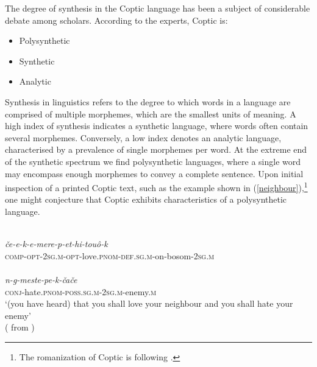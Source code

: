 \documentclass[output=paper,colorlinks,citecolor=brown ,chinesefont]{langscibook}
\begin{document}
The degree of synthesis in the Coptic language has been a subject of considerable debate among scholars. According to the experts, Coptic is:

\begin{itemize}
    \item Polysynthetic \citep[51, 92, 220]{loprieno1}
    \item Synthetic \citep[121]{haspelmath}
    \item Analytic \citep{reintges1,reintges2,egedi}
\end{itemize}

Synthesis in linguistics refers to the degree to which words in a language are comprised of multiple morphemes, which are the smallest units of meaning. A high index of synthesis indicates a synthetic language, where words often contain several morphemes. Conversely, a low index denotes an analytic language, characterised by a prevalence of single morphemes per word. At the extreme end of the synthetic spectrum we find polysynthetic languages, where a single word may encompass enough morphemes to convey a complete sentence. Upon initial inspection of a printed Coptic text, such as the example shown in (\ref{neighbour}),\footnote{The romanization of Coptic is following \citet{grossmanhaspelamth}.}  one might conjecture that Coptic exhibits characteristics of a polysynthetic language.


\begin{exe}
\ex\label{neighbour} 
\glll {}\\
\textit{če-e-k-e-mere-p-et-hi-touô-k}\\
\textsc{comp}-\textsc{opt}-\textsc{2sg.m}-\textsc{opt}-love.\textsc{pnom}-\textsc{def.sg.m}-on-bosom-\textsc{2sg.m} \\

\glll  {} \\
\textit{n-g-meste-pe-k-čače}\\
 \textsc{conj}-hate.\textsc{pnom}-\textsc{poss.sg.m}-\textsc{2sg.m}-enemy.\textsc{m} \\
\glt ‘(you have heard) that you shall love your neighbour and you shall hate your enemy' \\
\hspace*{\fill}( from \citet[958]{wilmet}) 
\end{exe}
\end{document}
